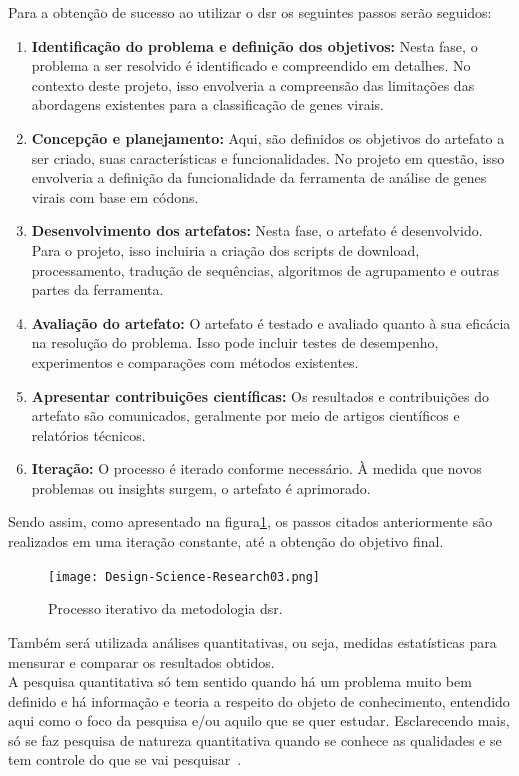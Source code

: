 Para a obtenção de sucesso ao utilizar o \gls{dsr} os seguintes passos serão seguidos:
\begin{enumerate}
  \item \textbf{Identificação do problema e definição dos objetivos:} Nesta fase, o problema a ser resolvido é identificado e compreendido em detalhes. No contexto deste projeto, isso envolveria a compreensão das limitações das abordagens existentes para a classificação de genes virais.
  \item \textbf{Concepção e planejamento:} Aqui, são definidos os objetivos do artefato a ser criado, suas características e funcionalidades. No projeto em questão, isso envolveria a definição da funcionalidade da ferramenta de análise de genes virais com base em códons.
  \item \textbf{Desenvolvimento dos artefatos:} Nesta fase, o artefato é desenvolvido. Para o projeto, isso incluiria a criação dos scripts de download, processamento, tradução de sequências, algoritmos de agrupamento e outras partes da ferramenta.
  \item \textbf{Avaliação do artefato:} O artefato é testado e avaliado quanto à sua eficácia na resolução do problema. Isso pode incluir testes de desempenho, experimentos e comparações com métodos existentes.
  \item \textbf{Apresentar contribuições científicas:} Os resultados e contribuições do artefato são comunicados, geralmente por meio de artigos científicos e relatórios técnicos.
  \item \textbf{Iteração:} O processo é iterado conforme necessário. À medida que novos problemas ou insights surgem, o artefato é aprimorado.
\end{enumerate}

Sendo assim, como apresentado na figura\ref{fig:processoDSR}, os passos citados anteriormente são realizados em uma iteração constante, até a obtenção do objetivo final.

\begin{figure}[htb]
  \centering
  \caption{Processo iterativo da metodologia \gls{dsr}.}
  \texttt{[image: Design-Science-Research03.png]}
  ~\label{fig:processoDSR}
\end{figure}

Também será utilizada análises quantitativas, ou seja, medidas estatísticas para mensurar e comparar os resultados obtidos.\\
A pesquisa quantitativa só tem sentido quando há um problema muito bem definido e há informação e teoria a respeito do objeto de conhecimento, entendido aqui como o foco da pesquisa e/ou aquilo que se quer estudar. Esclarecendo mais, só se faz pesquisa de natureza quantitativa quando se conhece as qualidades e se tem controle do que se vai pesquisar~\cite{da_silva_pesquisa_2014}.

